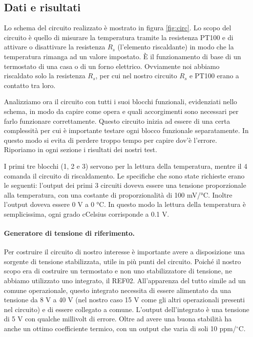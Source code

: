 \subsection{Dati e risultati}

Lo schema del circuito realizzato è mostrato in figura \ref{fig:circ}. Lo scopo del circuito è
quello di misurare la temperatura tramite la resistenza PT100 e di attivare o disattivare
la resistenza $R_s$ (l'elemento riscaldante) in modo che la temperatura rimanga ad un valore impostato.
È il funzionamento di base di un termostato di una casa o di un forno elettrico.
Ovviamente noi abbiamo riscaldato solo la resistenza $R_s$, per cui nel nostro circuito
$R_s$ e PT100 erano a contatto tra loro. 

Analizziamo ora il circuito con tutti i suoi blocchi funzionali, evidenziati nello schema,
in modo da capire come opera e quali accorgimenti sono necessari per farlo funzionare correttamente.
Questo circuito inizia ad essere di una certa complessità per cui è importante testare ogni blocco
funzionale separatamente. In questo modo si evita di perdere troppo tempo per capire dov'è l'errore.
Riporiamo in ogni sezione i risultati dei nostri test.

I primi tre blocchi (1, 2 e 3) servono per la lettura della temperatura, mentre il 4 comanda il circuito di riscaldamento.
Le specifiche che sono state richieste erano le seguenti: l'output dei primi 3 circuiti doveva essere una tensione
proporzionale alla temperatura, con una costante di proporzionalità di 100 mV/\si{\celsius}. Inoltre
l'output doveva essere 0 V a 0 \si{\celsius}. In questo modo la lettura della temperatura è semplicissima,
ogni grado cCelsius corrisponde a 0.1 V.

\paragraph{Generatore di tensione di riferimento.}

Per costruire il circuito di nostro interesse è importante avere a disposizione una sorgente di tensione
stabilizzata, utile in più punti del circuito. Poiché il nostro scopo era di costruire un termostato
e non uno stabilizzatore di tensione, ne abbiamo utilizzato uno integrato, il REF02. All'apparenza del tutto
simile ad un comune operazionale, questo integrato necessita di essere alimentato da una tensione da 8 V a 40 V
(nel nostro caso 15 V come gli altri operazionali presenti nel circuito) e di essere collegato a comune. L'output
dell'integrato è una tensione di 5 V con qualche millivolt di errore. Oltre ad avere una buona stabilità
ha anche un ottimo coefficiente termico, con un output che varia di soli 10 ppm/$^\circ$C.

